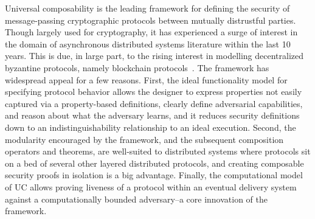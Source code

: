 
Universal composability is the leading framework for defining the security of
message-passing cryptographic protocols between mutually distrustful parties.
Though largely used for cryptography, it has experienced a surge of interest in
the domain of asynchronous distributed systems literature within the last 10
years.  This is due, in large part, to the rising interest in modelling
decentralized byzantine protocols, namely blockchain
protocols~\cite{kosba2016hawk, badertscher2018ouroboros, miller2019sprites,
badertscher2024bitcoin, dziembowski2018fairswap, aumayr2021blitz,
kiayias2020composable}.
The framework has widespread appeal for a few reasons.  First, the ideal
functionality model for specifying protocol behavior allows the designer to
express properties not easily captured via a property-based definitions,
clearly define adversarial capabilities, and reason about what the adversary
learns, and it reduces security definitions down to an indistinguishability
relationship to an ideal execution.  Second, the modularity encouraged by the
framework, and the subsequent composition operators and theorems, are
well-suited to distributed systems where protocols sit on a bed of several
other layered distributed protocols, and creating composable security proofs in
isolation is a big advantage.  Finally, the computational model of UC allows
proving liveness of a protocol within an eventual delivery system against a
computationally bounded adversary--a core innovation of the framework.

